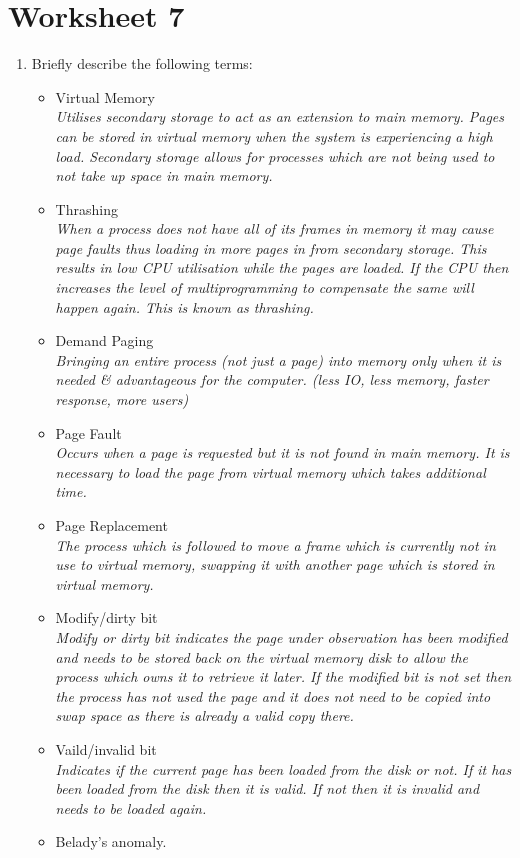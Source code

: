 \documentclass{article}
\newcommand{\answercolor}{Bittersweet}
\newcommand{\answer}[1]{{\\\color{\answercolor}\footnotesize\itshape{#1}}}
\begin{document}
	\section{Worksheet 7}
	\begin{enumerate}
		\item Briefly describe the following terms:
			\begin{itemize}
				\item Virtual Memory
				\answer{Utilises secondary storage to act as an extension to main memory. Pages can be stored in virtual memory when the system is experiencing a high load. Secondary storage allows for processes which are not being used to not take up space in main memory.}
				\item Thrashing
				\answer{When a process does not have all of its frames in memory it may cause page faults thus loading in more pages in from secondary storage. This results in low CPU utilisation while the pages are loaded. If the CPU then increases the level of multiprogramming to compensate the same will happen again. This is known as thrashing.}
				\item Demand Paging
				\answer{Bringing an entire process (not just a page) into memory only when it is needed \& advantageous for the computer. (less IO, less memory, faster response, more users)}
				\item Page Fault
				\answer{Occurs when a page is requested but it is not found in main memory. It is necessary to load the page from virtual memory which takes additional time.}
				\item Page Replacement
                \answer{The process which is followed to move a frame which is currently not in use to virtual memory, swapping it with another page which is stored in virtual memory.}
				\item Modify/dirty bit
                \answer{Modify or dirty bit indicates the page under observation has been modified and needs to be stored back on the virtual memory disk to allow the process which owns it to retrieve it later. If the modified bit is not set then the process has not used the page and it does not need to be copied into swap space as there is already a valid copy there.}
				\item Vaild/invalid bit
                \answer{Indicates if the current page has been loaded from the disk or not. If it has been loaded from the disk then it is valid. If not then it is invalid and needs to be loaded again.}
				\item Belady's anomaly.

\end{itemize}
\end{enumerate}
\end{document}
